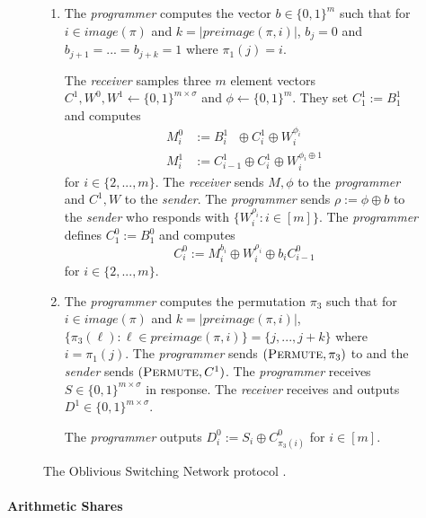 \begin{figure}[ht!]
{\begin{minipage}{0.95\linewidth}
\begin{enumerate}[leftmargin=.2cm]
\begin{enumerate}[leftmargin=.8cm]
					The \emph{programmer}  sends $(\textsc{Permute}, \pi_1)$ to  and the \emph{sender} sends $(\textsc{Permute}, A)$. The \emph{programmer} receives $B^{0}\in \{0,1\}^{m\times \sigma}$ in response and the \emph{receiver} receives $B^{1}\in \{0,1\}^{m\times \sigma}$. 
					
					\item The \emph{programmer}  computes the vector $b\in\{0,1\}^{m}$ such that for $i\in image(\pi)$ and $k=|preimage(\pi, i)|$, $b_j = 0$ and $b_{j+1}=...=b_{j+k}=1$ where $\pi_1(j)=i$.
					
					The \emph{receiver} samples three $m$ element vectors $C^{1}, W^0,W^1\gets \{0,1\}^{m\times \sigma}$ and $\phi\gets\{0,1\}^m$. They set $C^{1}_1:=B^{1}_1$ and computes 
					\begin{align*}
						M^0_i&:= B^1_{i}\ \ \, \oplus C^{1}_i \oplus W^{\phi_i}_i\\
						M^1_i&:= C^1_{i-1} \oplus C^{1}_i \oplus W^{\phi_i\oplus 1}_i
					\end{align*}
					for $i\in \{2,...,m\}$. The \emph{receiver} sends $M,\phi$ to the \emph{programmer} and $C^{1},W$ to the \emph{sender}. The \emph{programmer} sends $\rho:=\phi\oplus b$ to the \emph{sender} who responds with $\{ W^{\rho_i}_i : i\in [m] \}$. The \emph{programmer} defines $C^{0}_1:=B^{0}_1$ and computes 
					$$
						C^{0}_i:= M^{b_i}_i \oplus W^{\rho_i}_i\oplus b_iC^{0}_{i-1}
					$$
					for $i\in \{2,...,m\}$.
					\item The \emph{programmer} computes the permutation $\pi_3$ such that for  $i\in image(\pi)$ and $k=|preimage(\pi, i)|$, $\{\pi_3(\ell) : \ell\in preimage(\pi, i)\}=\{j, ..., j +k\}$ where $i=\pi_1(j)$.	The \emph{programmer} sends $(\textsc{Permute}, \pi_3)$ to  and the \emph{sender} sends $(\textsc{Permute}, C^{1})$.  The \emph{programmer} receives $S\in \{0,1\}^{m\times \sigma }$ in response. The \emph{receiver} receives and outputs $D^{1}\in \{0,1\}^{m\times \sigma }$.
					
					The \emph{programmer} outputs $D^{0}_i:=S_i\oplus C^{0}_{\pi_3(i)}$ for $i\in [m]$.
				\end{enumerate}
			\end{enumerate}
	\end{minipage}}
	\caption{The Oblivious Switching Network protocol . }
	\label{fig:switching-net}	
\end{figure}

\iffullversion
\paragraph{Arithmetic Shares}

